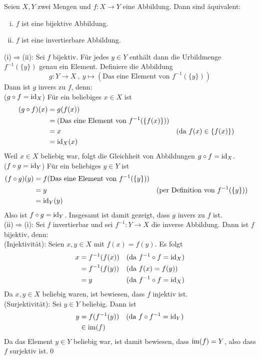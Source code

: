 \begin{sat} \label{invkriterium}
Seien $X,Y$ zwei Mengen und $f:X\to Y$ eine Abbildung. Dann sind äquivalent:
\begin{enumerate}[(i)]
 \item $f$ ist eine bijektive Abbildung.
 \item $f$ ist eine invertierbare Abbildung.
\end{enumerate}
\end{sat}
\begin{bew}
 (i)$\Rightarrow$(ii): Sei $f$ bijektiv. Für jedes $y\in Y$ enthält dann die Urbildmenge $f^{-1}(\{y\})$ genau ein Element. Definiere die Abbildung
 \[ g : Y\to X \ ,\ y \mapsto (\text{Das eine Element von $f^{-1}(\{y\})$}) \]
 Dann ist $g$ invers zu $f$, denn: \\
 ($g\circ f=\operatorname{id}_X$) Für ein beliebiges $x\in X$ ist
 \begin{align*}
  (g\circ f)(x) & = g(f(x)) \\
  & = (\text{Das eine Element von $f^{-1}(\{f(x)\})$}) \\
  & = x && (\text{da $f(x)\in \{f(x)\}$}) \\
  & = \operatorname{id}_X(x)
 \end{align*}
 Weil $x\in X$ beliebig war, folgt die Gleichheit von Abbildungen $g\circ f=\operatorname{id}_X$. \\[0.5em]
 ($f\circ g=\operatorname{id}_Y$) Für ein beliebiges $y\in Y$ ist
  \begin{align*}
  (f\circ g)(y) & = f(\text{Das eine Element von $f^{-1}(\{y\})$}) \\
  & = y && (\text{per Definition von $f^{-1}(\{y\})$}) \\
  & = \operatorname{id}_Y(y)
 \end{align*}
 Also ist $f\circ g=\operatorname{id}_Y$. Insgesamt ist damit gezeigt, dass $g$ invers zu $f$ ist. \\[0.5em]
 (ii)$\Rightarrow$(i): Sei $f$ invertierbar und sei $f^{-1}:Y\to X$ die inverse Abbildung. Dann ist $f$ bijektiv, denn: \\
 (Injektivität): Seien $x,y\in X$ mit $f(x)=f(y)$. Es folgt
 \begin{align*}
   x & = f^{-1}(f(x)) && (\text{da $f^{-1}\circ f=\operatorname{id}_X$})\\
   & = f^{-1}(f(y)) &&  (\text{da $f(x)=f(y)$}) \\
   & = y  &&  (\text{da $f^{-1}\circ f=\operatorname{id}_X$})
 \end{align*}
 Da $x,y\in X$ beliebig waren, ist bewiesen, dass $f$ injektiv ist. \\
 (Surjektivität): Sei $y\in Y$ beliebig. Dann ist
 \begin{align*}
  y & = f(f^{-1}(y)) && (\text{da $f\circ f^{-1}=\operatorname{id}_Y$}) \\
  & \in \operatorname{im}(f)
 \end{align*}
Da das Element $y\in Y$ beliebig war, ist damit bewiesen, dass $\operatorname{im}(f)=Y$, also dass $f$ surjektiv ist.\qed
\end{bew}





